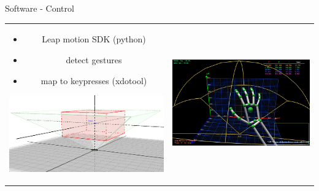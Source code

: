 \documentclass[xcolor=svgnames,handout,aspectratio=169]{beamer}
\begin{document}
\begin{frame}
	{Software - Control}

	\begin{tabular}{cl}  
			\parbox{0.35\linewidth}{
				\begin{itemize}
					\item Leap motion SDK (python)
					\item detect gestures
					\item map to keypresses (xdotool)
				\end{itemize}
				
				\includegraphics[width=\linewidth]{images/Leap_InteractionBox}
			}&
			\parbox{0.6\linewidth}{			
				\includegraphics[width=\linewidth]{images/leap_visualizer.jpg}
			}
		\end{tabular}
\end{frame}
\end{document}
